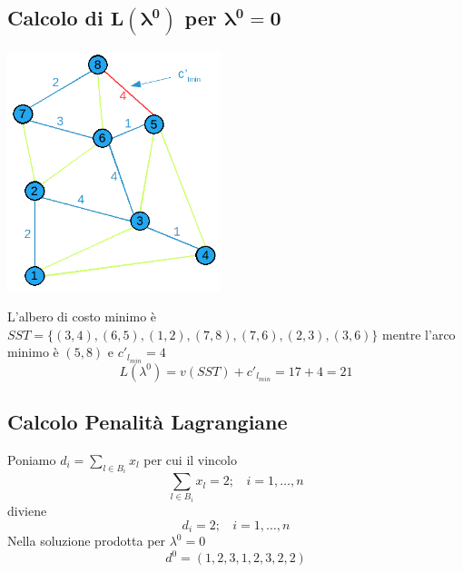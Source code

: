 \subsection{Calcolo di $\boldsymbol{L(\lambda^{0})}$ per $\boldsymbol{\lambda^{0}=0}$}
\centerline{\includegraphics[height=7cm]{images/graph31.png}}
L'albero di costo minimo è $SST=\{(3,4),(6,5),(1,2),(7,8),(7,6),(2,3),(3,6)\}$ mentre l'arco minimo è $(5,8)$ e $c'_{l_{min}}=4$
\begin{equation*}
	L(\lambda^{0})=v(SST)+c'_{l_{min}}=17+4=21
\end{equation*}

\subsection{Calcolo Penalità Lagrangiane}
Poniamo $d_{i}=\sum_{l\in B_{i}}x_{l}$ per cui il vincolo
\begin{equation*}
	\sum_{l\in B_{i}}x_{l}=2;\ \ \ \ i=1,\dots,n
\end{equation*}
diviene
\begin{equation*}
	d_{i}=2;\ \ \ \ i=1,\dots,n
\end{equation*}
Nella soluzione prodotta per $\lambda^{0}=0$
\begin{equation*}
	d^{0}=(1,2,3,1,2,3,2,2)
\end{equation*}

\centerline{}

